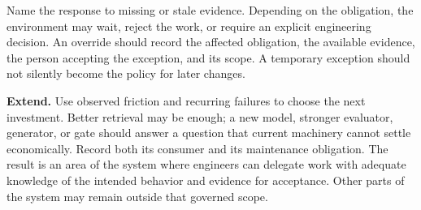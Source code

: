 Name the response to missing or stale evidence. Depending on the obligation, the environment may wait, reject the work, or require an explicit engineering decision. An override should record the affected obligation, the available evidence, the person accepting the exception, and its scope. A temporary exception should not silently become the policy for later changes.

\textbf{Extend.} Use observed friction and recurring failures to choose the next investment. Better retrieval may be enough; a new model, stronger evaluator, generator, or gate should answer a question that current machinery cannot settle economically. Record both its consumer and its maintenance obligation. The result is an area of the system where engineers can delegate work with adequate knowledge of the intended behavior and evidence for acceptance. Other parts of the system may remain outside that governed scope.
